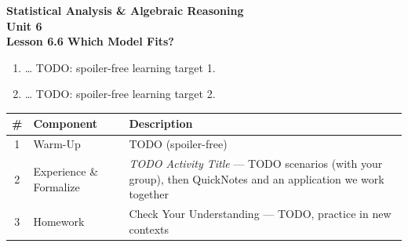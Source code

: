 \documentclass[10pt]{article}
\begin{document}
\vspace{-0.8in}

\begin{center}
  {\color{white}\textbf{\LARGE Statistical Analysis \& Algebraic Reasoning}}\\[4pt]
  {\color{frostmid}\large\textbf{Unit 6}}\\[6pt]
  {\color{white}\textbf{\large Lesson 6.6 \quad Which Model Fits?}}
\end{center}

\vspace{0.22in}
\namedateperiod
\vspace{0.18in}

\begin{learningtargetbox}
\small
\begin{enumerate}[leftmargin=1.5em, itemsep=5pt]
  \item \ldots{} TODO: spoiler-free learning target 1.
  \item \ldots{} TODO: spoiler-free learning target 2.
\end{enumerate}
\end{learningtargetbox}

\vspace{0.14in}

\begin{tocbox}
\small
\renewcommand{\arraystretch}{1.5}
\begin{tabularx}{\linewidth}{@{} c l X @{}}
\rowcolor{frost}
\textbf{\#} & \textbf{Component} & \textbf{Description} \\
\midrule
1 & Warm-Up    & TODO (spoiler-free) \\
2 & Experience \& Formalize & \emph{TODO Activity Title} --- TODO scenarios (with your group),
                 then QuickNotes and an application we work together \\
3 & Homework   & Check Your Understanding --- TODO, practice in new contexts \\
\end{tabularx}
\end{tocbox}
\end{document}
